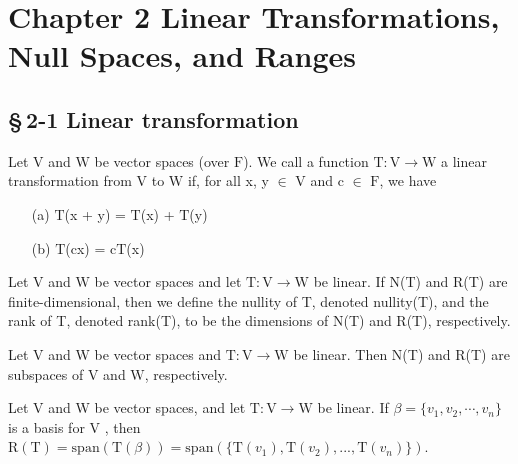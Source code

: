 
\linespread{1.6} %
\parindent=0pt %

	\section*{Chapter 2 Linear Transformations, Null Spaces, and Ranges}	
	\subsection*{\S\,2-1 Linear transformation}
\begin{defn}
$ $\\	Let $\mathrm{V}$ and $\mathrm{W}$ be vector spaces (over $\mathrm{F}$). We call a function $\mathrm{T}: \mathrm{V}  \rightarrow  \mathrm{W}$    a linear transformation from $\mathrm{V}$ to $\mathrm{W}$ if, for all x, y $\in$ $\mathrm{V}$ and c $\in$ $\mathrm{F}$, we have

\begin{enumerate}
	\item [(a)]   $\mathrm{T}$(x + y) = $\mathrm{T}$(x) + $\mathrm{T}$(y) 
	\item [(b)]    $\mathrm{T}$($\mathrm{c}$x) = $\mathrm{c}\mathrm{T}$(x)
\end{enumerate} 
\end{defn}

\begin{defn}
$ $\\	Let $\mathrm{V}$ and $\mathrm{W}$ be vector spaces and let $\mathrm{T}: \mathrm{V}  \rightarrow  \mathrm{W}$ be linear. If N(T) and R(T) are finite-dimensional, then we define the nullity of T, denoted nullity(T), and the rank of T, denoted rank(T), to be the dimensions of N(T) and R(T), respectively.
\end{defn}

\begin{thm*}
$ $ \\ 	Let V and W be vector spaces and $\mathrm{T}: \mathrm{V}  \rightarrow  \mathrm{W}$ be linear. Then N(T) and R(T) are subspaces of $\mathrm{V}$ and $\mathrm{W}$, respectively.
\end{thm*}

\begin{thm*}
$ $\\
 Let V and W be vector spaces, and let $\mathrm{T} : \mathrm{V}  \rightarrow \mathrm{W}$ be linear. If $\beta = \{ v_1,v_2,\cdots,v_n \}$ is a basis for $\mathrm{V}$ , then $ \mathrm{R}(\mathrm{T}) = \mathrm{span}(\mathrm{T}(\beta)) = \mathrm{span}(\{\mathrm{T}(v_1), \mathrm{T}(v_2), . . . , \mathrm{T}(v_n)\})$.

\end{thm*}

